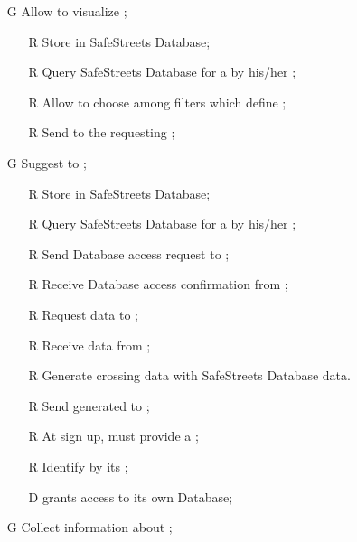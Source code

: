 \documentclass[../../../rasd.tex]{subfiles}
\begin{document}
\begin{itemize}
	\item[G\subs{5}]Allow  to visualize ;
	\begin{itemize}
		\item[R\subs{10}]Store  in SafeStreets Database;
		\item[R\subs{13}]Query SafeStreets Database for a  by his/her ;
		\item[R\subs{23}]Allow  to choose among filters which define ;
		\item[R\subs{24}]Send  to the requesting ;
	\end{itemize}

	\item[G\subs{6}]Suggest  to ;
	\begin{itemize}
		\item[R\subs{10}]Store  in SafeStreets Database;
		\item[R\subs{13}]Query SafeStreets Database for a  by his/her ;
		\item[R\subs{25}]Send  Database access request to ; 
		\item[R\subs{26}]Receive  Database access confirmation from ;
		\item[R\subs{27}]Request  data to ;
		\item[R\subs{28}]Receive  data from ;
		\item[R\subs{29}]Generate  crossing   data with SafeStreets Database data.
		\item[R\subs{30}]Send generated  to ;
		\item[R\subs{31}]At sign up,  must provide a ;
		\item[R\subs{32}]Identify  by its ;
		\\
		\item[D\subs{8}] grants access to its own  Database;
	\end{itemize}

	\item[G\subs{7}]Collect information about ;
	\begin{itemize}
	

\end{itemize}
\end{itemize}
\end{document}
